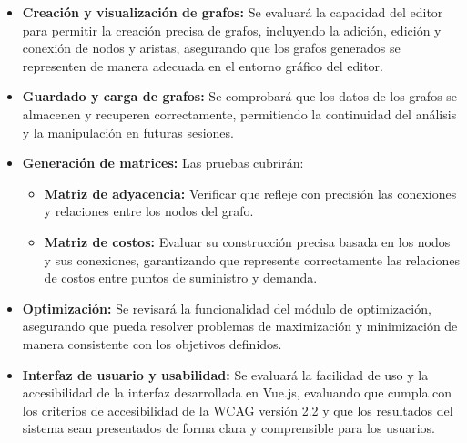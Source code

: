 \documentclass[stu, 12pt, letterpaper, donotrepeattitle, floatsintext, natbib]{apa7}
\begin{document}
\begin{itemize}
    \item \textbf{Creación y visualización de grafos:} Se evaluará la capacidad del editor para permitir la creación precisa de grafos, incluyendo la adición, edición y conexión de nodos y aristas, asegurando que los grafos generados se representen de manera adecuada en el entorno gráfico del editor.
    
    \item \textbf{Guardado y carga de grafos:} Se comprobará que los datos de los grafos se almacenen y recuperen correctamente, permitiendo la continuidad del análisis y la manipulación en futuras sesiones.

    \item \textbf{Generación de matrices:} Las pruebas cubrirán:
    \begin{itemize}
        \item \textbf{Matriz de adyacencia:} Verificar que refleje con precisión las conexiones y relaciones entre los nodos del grafo.
        \item \textbf{Matriz de costos:} Evaluar su construcción precisa basada en los nodos y sus conexiones, garantizando que represente correctamente las relaciones de costos entre puntos de suministro y demanda.
    \end{itemize}

    \item \textbf{Optimización:} Se revisará la funcionalidad del módulo de optimización, asegurando que pueda resolver problemas de maximización y minimización de manera consistente con los objetivos definidos.

    \item \textbf{Interfaz de usuario y usabilidad:} Se evaluará la facilidad de uso y la accesibilidad de la interfaz desarrollada en Vue.js, evaluando que cumpla con los criterios de accesibilidad de la WCAG versión 2.2 y que los resultados del sistema sean presentados de forma clara y comprensible para los usuarios.


\end{itemize}
\end{document}
